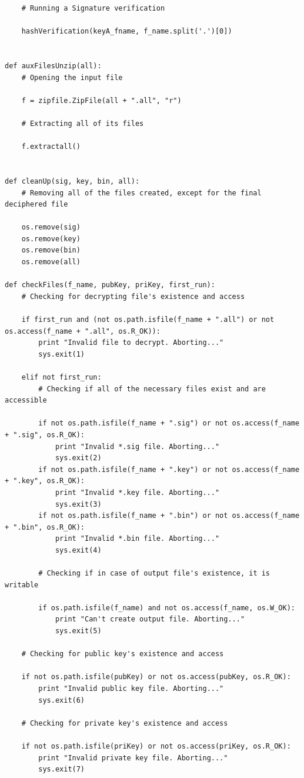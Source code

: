 \documentclass[a4paper,11pt,openright,oneside]{report}
\begin{document}
\begin{verbatim}
    # Running a Signature verification

    hashVerification(keyA_fname, f_name.split('.')[0])


def auxFilesUnzip(all):
    # Opening the input file

    f = zipfile.ZipFile(all + ".all", "r")

    # Extracting all of its files

    f.extractall()


def cleanUp(sig, key, bin, all):
    # Removing all of the files created, except for the final deciphered file

    os.remove(sig)
    os.remove(key)
    os.remove(bin)
    os.remove(all)

def checkFiles(f_name, pubKey, priKey, first_run):
    # Checking for decrypting file's existence and access

    if first_run and (not os.path.isfile(f_name + ".all") or not os.access(f_name + ".all", os.R_OK)):
        print "Invalid file to decrypt. Aborting..."
        sys.exit(1)

    elif not first_run:
        # Checking if all of the necessary files exist and are accessible

        if not os.path.isfile(f_name + ".sig") or not os.access(f_name + ".sig", os.R_OK):
            print "Invalid *.sig file. Aborting..."
            sys.exit(2)
        if not os.path.isfile(f_name + ".key") or not os.access(f_name + ".key", os.R_OK):
            print "Invalid *.key file. Aborting..."
            sys.exit(3)
        if not os.path.isfile(f_name + ".bin") or not os.access(f_name + ".bin", os.R_OK):
            print "Invalid *.bin file. Aborting..."
            sys.exit(4)

        # Checking if in case of output file's existence, it is writable

        if os.path.isfile(f_name) and not os.access(f_name, os.W_OK):
            print "Can't create output file. Aborting..."
            sys.exit(5)

    # Checking for public key's existence and access

    if not os.path.isfile(pubKey) or not os.access(pubKey, os.R_OK):
        print "Invalid public key file. Aborting..."
        sys.exit(6)

    # Checking for private key's existence and access

    if not os.path.isfile(priKey) or not os.access(priKey, os.R_OK):
        print "Invalid private key file. Aborting..."
        sys.exit(7)



\end{verbatim}
\end{document}
